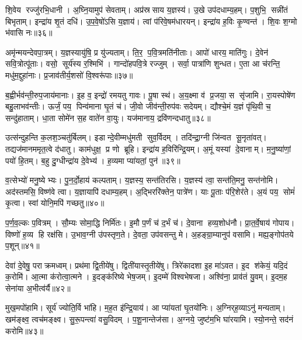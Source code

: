 शि॒वेय रज्जु॑रभि॒धानी।
अ॒घ्नि॒यामुप॑ सेवताम्।
अप्र॑स्रसाय य॒ज्ञस्य॑।
उ॒खे उप॑दधाम्य॒हम्।
प॒शुभि॒ सन्नी॑तं बिभृताम्।
इन्द्रा॑य शृ॒तं दधि॑।
उ॒प॒वे॒षो॑ऽसि य॒ज्ञाय॑।
त्वां प॑रिवे॒षम॑धारयन्।
इन्द्रा॑य ह॒विः कृ॒ण्वन्त॑।
शि॒वः श॒ग्मो भ॑वासि नः॥३६॥

अमृ॑न्मयन्देवपा॒त्रम्।
य॒ज्ञस्यायु॑षि॒ प्र यु॑ज्यताम्।
ति॒र॒ प॒वि॒त्रमति॑नीताः।
आपो॑ धारय॒ माति॑गुः।
दे॒वेन॑ सवि॒त्रोत्पू॑ताः।
वसो॒ सूर्य॑स्य र॒श्मिभि॑।
गान्दो॑हपवि॒त्रे रज्जुम्।
सर्वा॒ पात्रा॑णि शुन्धत।
ए॒ता आ च॑रन्ति॒ मधु॑म॒द्दुहा॑नाः।
प्र॒जाव॑तीर्य॒शसो॑ वि॒श्वरू॑पाः॥३७॥

ब॒ह्वीर्भव॑न्ती॒रुप॒जाय॑मानाः।
इ॒ह व॒ इन्द्रो॑ रमयतु गावः।
पू॒षा स्थ॑।
अ॒य॒क्ष्मा व॑ प्र॒जया॒ स सृ॑जामि।
रा॒यस्पोषे॑ण बहु॒लाभव॑न्तीः।
ऊर्जं॒ पय॒ पिन्व॑माना घृ॒तं च॑।
जी॒वो जीव॑न्ती॒रुप॑वः सदेयम्।
द्यौश्चे॒मं य॒ज्ञं पृ॑थि॒वी च॒ सन्दु॑हाताम्।
धा॒ता सोमे॑न स॒ह वाते॑न वा॒युः।
यज॑मानाय॒ द्रवि॑णन्दधातु॥३८॥

उत्स॑न्दुहन्ति क॒लश॒ञ्चतु॑र्बिलम्।
इडान्दे॒वीम्मधु॑मती सुव॒र्विदम्।
तदि॑न्द्रा॒ग्नी जि॑न्वत सू॒नृता॑वत्।
तद्यज॑मानममृत॒त्वे द॑धातु।
काम॑धुक्ष॒ प्र णो ब्रूहि।
इन्द्रा॑य ह॒विरि॑न्द्रि॒यम्।
अ॒मूं यस्यां दे॒वानाम्।
म॒नु॒ष्या॑णां॒ पयो॑ हि॒तम्।
ब॒हु दु॒ग्धीन्द्रा॑य दे॒वेभ्य॑।
ह॒व्यमा प्या॑यतां॒ पुन॑॥३९॥

व॒त्सेभ्यो॑ मनु॒ष्येभ्यः।
पु॒न॒र्दो॒हाय॑ कल्पताम्।
य॒ज्ञस्य॒ सन्त॑तिरसि।
य॒ज्ञस्य॑ त्वा॒ सन्त॑ति॒मनु॒ सन्त॑नोमि।
अद॑स्तमसि॒ विष्ण॑वे त्वा।
य॒ज्ञायापि॑ दधाम्य॒हम्।
अ॒द्भिररि॑क्तेन॒ पात्रे॑ण।
याः पू॒ताः प॑रि॒शेर॑ते।
अ॒यं पय॒ सोमं॑ कृ॒त्वा।
स्वां योनि॒मपि॑ गच्छतु॥४०॥

प॒र्ण॒व॒ल्कः प॒वित्रम्।
सौ॒म्यः सोमा॒द्धि निर्मि॑तः।
इ॒मौ प॒र्णं च॑ द॒र्भं च॑।
दे॒वाना हव्य॒शोध॑नौ।
प्रा॒त॒र्वे॒षाय॑ गोपाय।
विष्णो॑ ह॒व्य हि रक्ष॑सि।
उ॒भाव॒ग्नी उ॑पस्तृण॒ते।
दे॒वता॒ उप॑वसन्तु मे।
अ॒हङ्ग्रा॒म्यानुप॑ वसामि।
मह्य॒ङ्गोप॑तये प॒शून्॥४१॥\anuvakamend[आभृ॑त इ॒मं गृ॑ह्णामि॒ पूर्व॒स्ताः पूर्व॒ परि॑गृह्णामि सभापा॒ला इन्द्र॑ज्येष्ठेभ्य॒ आदि॑त्य व्रतपते सुस॒म्भृता॑ मे स॒ह पु॑नातु गहि नो वि॒श्वरू॑पा दधातु॒ पुन॑र्गच्छतु प॒शून् (याः पु॒रस्ता॑दि॒मामूर्ज॑मि॒ह प्र॒जा इ॒ह प॒शवो॒ऽयं पि॑तृ॒णाम॒ग्निः।
)]

देवा॑ दे॒वेषु॒ पराक्रमध्वम्।
प्रथ॑मा द्वि॒तीये॑षु।
द्विती॑यास्तृ॒तीये॑षु।
त्रिरे॑कादशा इ॒ह मा॑ऽवत।
इ॒द श॑केयं॒ यदि॒दं क॒रोमि॑।
आ॒त्मा क॑रोत्वा॒त्मने।
इ॒दङ्क॑रिष्ये भेष॒जम्।
इ॒दम्मे॑ विश्वभेषजा।
अश्वि॑ना॒ प्राव॑तं यु॒वम्।
इ॒दम॒ह सेना॑या अ॒भीत्व॑र्यै॥४२॥

मुख॒मपो॑हामि।
सूर्य॑ ज्योति॒र्वि भा॑हि।
म॒ह॒त इ॑न्द्रि॒याय॑।
आ प्या॑यतां घृ॒तयो॑निः।
अ॒ग्निर्‌ह॒व्याऽनु॑ मन्यताम्।
खम॑ङ्क्ष्व॒ त्वच॑मङ्क्ष्व।
सु॒रू॒पन्त्वा॑ वसु॒विदम्।
प॒शू॒नान्तेज॑सा।
अ॒ग्नये॒ जुष्ट॑म॒भि घा॑रयामि।
स्यो॒नन्ते॒ सद॑नं करोमि॥४३॥

